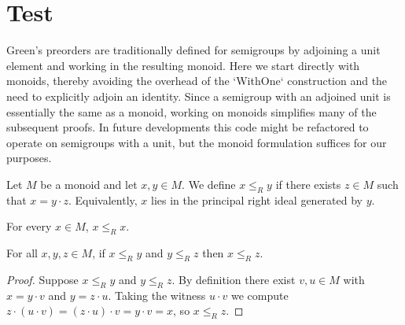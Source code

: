 
\section{Test}

Green's preorders are traditionally defined for semigroups by adjoining a unit element and working in the resulting monoid.  Here we start directly with monoids, thereby avoiding the overhead of the `WithOne` construction and the need to explicitly adjoin an identity.  Since a semigroup with an adjoined unit is essentially the same as a monoid, working on monoids simplifies many of the subsequent proofs.  In future developments this code might be refactored to operate on semigroups with a unit, but the monoid formulation suffices for our purposes.

\begin{definition}
\label{def:RRel}
Let \(M\) be a monoid and let \(x,y\in M\).  We define
\(x \le_R y\) if there exists \(z\in M\) such that \(x = y\cdot z\).
Equivalently, \(x\) lies in the principal right ideal generated by \(y\).
\end{definition}

\begin{lemma}[Reflexivity of \(\le_R\)]
\label{lem:RRel-refl}
For every \(x\in M\), \(x \le_R x\).
\end{lemma}

\begin{lemma}[Transitivity of \(\le_R\)]
\label{lem:RRel-trans}
For all \(x,y,z\in M\), if \(x \le_R y\) and \(y \le_R z\) then \(x \le_R z\).
\end{lemma}
\begin{proof}
Suppose \(x \le_R y\) and \(y \le_R z\).  By definition there exist \(v,u\in M\) with \(x = y\cdot v\) and \(y = z\cdot u\).  Taking the witness \(u\cdot v\) we compute \(z\cdot(u\cdot v) = (z\cdot u)\cdot v = y\cdot v = x\), so \(x \le_R z\).
\end{proof}